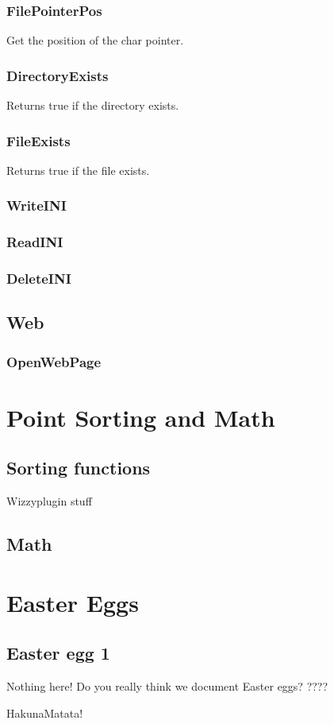 \documentclass[a4paper]{report}
\begin{document}
\subsection{FilePointerPos}

Get the position of the char pointer.

\subsection{DirectoryExists}

Returns true if the directory exists.

\subsection{FileExists}

Returns true if the file exists.

\subsection{WriteINI}
\subsection{ReadINI}
\subsection{DeleteINI}

\section{Web}

\subsection{OpenWebPage}

\chapter{Point Sorting and Math}
\section{Sorting functions}
Wizzyplugin stuff

\section{Math}

\chapter{Easter Eggs}
\section{Easter egg 1}
Nothing here! Do you really think we document Easter eggs?
????

HakunaMatata!
\end{document}
